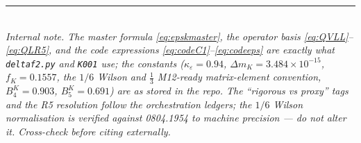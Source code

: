 \documentclass[11pt]{article}
\newcommand{\eps}{\varepsilon}
\newcommand{\dmk}{\Delta m_K}
\newcommand{\code}[1]{\texttt{#1}}
\theoremstyle{definition}
\begin{document}
\bigskip
\noindent\rule{\linewidth}{0.4pt}\\
\footnotesize
\emph{Internal note. The master formula \eqref{eq:epskmaster}, the operator basis
\eqref{eq:QVLL}--\eqref{eq:QLR5}, and the code expressions
\eqref{eq:codeC1}--\eqref{eq:codeeps} are exactly what \code{deltaf2.py} and
\code{K001} use; the constants ($\kappa_\eps=0.94$, $\dmk=3.484\times10^{-15}$,
$f_K=0.1557$, the $1/6$ Wilson and $\tfrac13$ M12-ready matrix-element convention,
$B_4^K=0.903$, $B_5^K=0.691$) are
as stored in the repo. The ``rigorous vs proxy'' tags and the R5 resolution follow
the orchestration ledgers; the $1/6$ Wilson normalisation is verified against
0804.1954 to machine precision --- do not alter it. Cross-check before citing
externally.}
\end{document}
